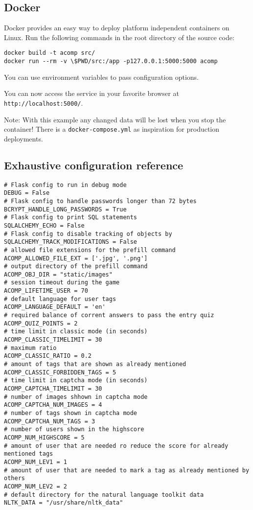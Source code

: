 \subsection{Docker}
\label{g14:sec:usage:docker}
Docker provides an easy way to deploy platform independent containers on Linux.
Run the following commands in the root directory of the source code:

\begin{verbatim}
docker build -t acomp src/
docker run --rm -v \$PWD/src:/app -p127.0.0.1:5000:5000 acomp
\end{verbatim}

You can use environment variables to pass configuration options.

You can now access the service in your favorite browser at
\texttt{http://localhost:5000/}.

Note: With this example any changed data will be lost when you stop the
container! There is a \texttt{docker-compose.yml} as inspiration for production deployments.

\subsection{Exhaustive configuration reference}
\begin{verbatim}
# Flask config to run in debug mode
DEBUG = False
# Flask config to handle passwords longer than 72 bytes
BCRYPT_HANDLE_LONG_PASSWORDS = True
# Flask config to print SQL statements
SQLALCHEMY_ECHO = False
# Flask config to disable tracking of objects by
SQLALCHEMY_TRACK_MODIFICATIONS = False
# allowed file extensions for the prefill command
ACOMP_ALLOWED_FILE_EXT = ['.jpg', '.png']
# output directory of the prefill command
ACOMP_OBJ_DIR = "static/images"
# session timeout during the game
ACOMP_LIFETIME_USER = 70
# default language for user tags
ACOMP_LANGUAGE_DEFAULT = 'en'
# required balance of corrent answers to pass the entry quiz
ACOMP_QUIZ_POINTS = 2
# time limit in classic mode (in seconds)
ACOMP_CLASSIC_TIMELIMIT = 30
# maximum ratio
ACOMP_CLASSIC_RATIO = 0.2
# amount of tags that are shown as already mentioned
ACOMP_CLASSIC_FORBIDDEN_TAGS = 5
# time limit in captcha mode (in seconds)
ACOMP_CAPTCHA_TIMELIMIT = 30
# number of images shhown in captcha mode
ACOMP_CAPTCHA_NUM_IMAGES = 4
# number of tags shown in captcha mode
ACOMP_CAPTCHA_NUM_TAGS = 3
# number of users shown in the highscore
ACOMP_NUM_HIGHSCORE = 5
# amount of user that are needed ro reduce the score for already mentioned tags
ACOMP_NUM_LEV1 = 1
# amount of user that are needed to mark a tag as already mentioned by others
ACOMP_NUM_LEV2 = 2
# default directory for the natural language toolkit data
NLTK_DATA = "/usr/share/nltk_data"
\end{verbatim}
